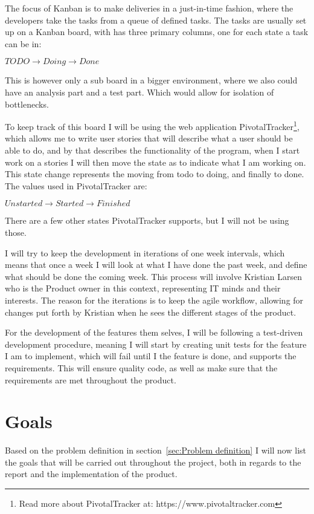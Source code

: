 The focus of Kanban is to make deliveries in a just-in-time fashion, where the
developers take the tasks from a queue of defined tasks. The tasks are usually
set up on a Kanban board, with has three primary columns, one for each state a
task can be in: 

\begin{center}
  $TODO \rightarrow Doing \rightarrow Done$
\end{center}

This is however only a sub board in a bigger environment, where we also could
have an analysis part and a test part. Which would allow for isolation of
bottlenecks\cite{kanban}. 

To keep track of this board I will be using the web application
PivotalTracker\footnote{Read more about PivotalTracker at:
  https://www.pivotaltracker.com}, which allows me to write user stories that
will describe what a user should be able to do, and by that describes the
functionality of the program, when I start work on a stories I will then move
the state as to indicate what I am working on. This state change represents the
moving from todo to doing, and finally to done. The values used in
PivotalTracker are: 

\begin{center}
  $Unstarted \rightarrow Started \rightarrow Finished$
\end{center}

There are a few other states PivotalTracker supports, but I will not be using
those. 

I will try to keep the development in iterations of one week intervals, which
means that once a week I will look at what I have done the past week, and define
what should be done the coming week. This process will involve Kristian Larsen
who is the Product owner in this context, representing IT minds and their
interests. The reason for the iterations is to keep the agile workflow, allowing
for changes put forth by Kristian when he sees the different stages of the
product. 

For the development of the features them selves, I will be following a
test-driven development procedure, meaning I will start by creating unit tests
for the feature I am to implement, which will fail until I the feature is done,
and supports the requirements. This will ensure quality code, as well as make
sure that the requirements are met throughout the product. 

\section{Goals}
\label{sec:Goals}
Based on the problem definition in section~\ref{sec:Problem definition} I will
now list the goals that will be carried out throughout the project, both in
regards to the report and the implementation of the product. 

